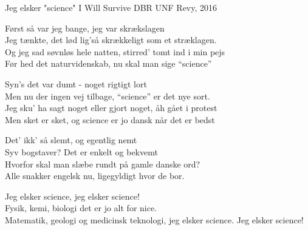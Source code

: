\begin{song}{Jeg elsker "science"}
  {} %
  {I Will Survive} %
  {DBR} %
  {UNF Revy, 2016} %
  {\NotCCLIed} %

  \begin{SBVerse}
    Først så var jeg bange, jeg var skrækslagen\\
    Jeg tænkte, det lød lig’så skrækkeligt som et stræklagen.\\
    Og jeg sad søvnløs hele natten, stirred’ tomt ind i min pejs\\
    Før hed det naturvidenskab, nu skal man sige “science”
  \end{SBVerse}

  \begin{SBVerse}
    Syn’s det var dumt - noget rigtigt lort\\
    Men nu der ingen vej tilbage, “science” er det nye sort.\\
    Jeg sku’ ha sagt noget eller gjort noget, åh gået i protest\\
    Men sket er sket, og science er jo dansk når det er bedst
  \end{SBVerse}

  \begin{SBVerse}
    Det’ ikk’ så slemt, og egentlig nemt\\
    Syv bogstaver? Det er enkelt og bekvemt\\
    Hvorfor skal man slæbe rundt på gamle danske ord?\\
    Alle snakker engelsk nu, ligegyldigt hvor de bor.
  \end{SBVerse}

  \begin{SBChorus}
    Jeg elsker science, jeg elsker science!\\
    Fysik, kemi, biologi det er jo alt for nice.\\
    Matematik, geologi og medicinsk teknologi,
    jeg elsker science. Jeg elsker science!
  \end{SBChorus}
\end{song}




